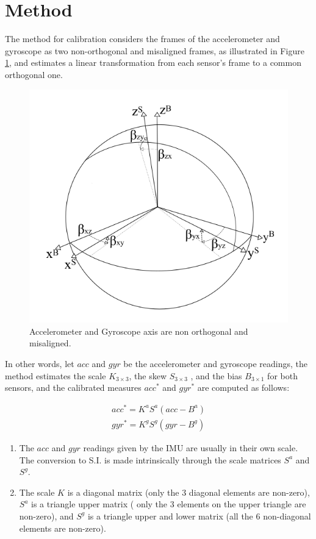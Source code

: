\section{Method}\label{sec: method}

The method for calibration considers the frames of the accelerometer and gyroscope as two non-orthogonal and misaligned frames, as illustrated in Figure \ref{fig:axis}, and estimates a linear transformation from each sensor's frame to a common orthogonal one.

\begin{figure}[h]
	\centering
	\includegraphics[width=0.5\linewidth]{figures/axis}
	\caption{Accelerometer and Gyroscope axis are non orthogonal and misaligned.}
	\label{fig:axis}
\end{figure}

In other words, let $acc$ and $gyr$ be the accelerometer and gyroscope readings, the method estimates the scale $K_{3\times 3}$, the skew $S_{3\times 3}$ , and the bias $B_{3\times 1}$ for both sensors, and the calibrated measures $acc^*$ and $gyr^*$  are computed as follows:

\begin{equation}
\begin{aligned}
acc^* = K^aS^a(acc - B^a) \\ 
gyr^* = K^gS^g(gyr - B^g) 
\end{aligned}
\end{equation}

\begin{important}
	\begin{enumerate}
		\item The $acc$ and $gyr$ readings given by the IMU are usually in their own scale. The conversion to S.I. is made intrinsically through the scale matrices $S^a$ and $S^g$.
		\item The scale  $K$ is a diagonal matrix (only the $3$ diagonal elements are non-zero),  $S^a$ is a triangle upper matrix ( only the $3$ elements on the upper triangle are non-zero), and $S^g$ is a triangle upper and lower matrix (all the $6$ non-diagonal elements are non-zero).
	\end{enumerate}
\end{important}

